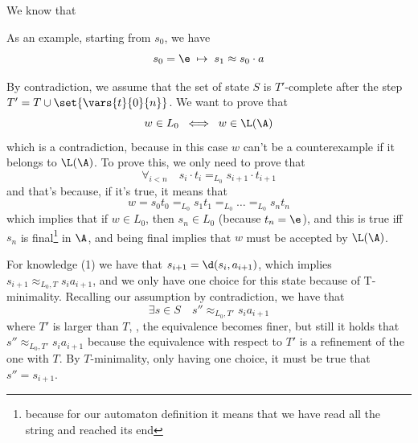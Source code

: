 \documentclass[oneside]{academica}
\begin{document}
\begin{proof*}
  We know that
  As an example, starting from $s_0$, we have
  \vspace{-10pt}
  \begin{equation*}
    s_0 = \e \;\mapsto\; s_1 \approx s_0 \cdot a
  \end{equation*}

  By contradiction, we assume that the set of state $S$ is $T'$-complete after the step $T' = T \cup \set{\vars{t}{0}{n}}$.
  We want to prove that
  \vspace{-10pt}
  \begin{equation*}
    w \in L_0 \;\iff\; w \in \L(\A)
  \end{equation*}
  which is a contradiction, because in this case $w$ can't be a counterexample if it belongs to $\L(\A)$.
  To prove this, we only need to prove that
  \vspace{-10pt}
  \begin{equation*}
    \forall_{i<n} \quad s_i \cdot t_i =_{L_0} s_{i+1} \cdot t_{i+1}
  \end{equation*}
  and that's because, if it's true, it means that
  \vspace{-10pt}
  \begin{equation*}
    w = s_0 t_0 =_{L_0} s_1 t_1 =_{L_0} \ldots =_{L_0} s_n t_n
  \end{equation*}
  which implies that if $w \in L_0$, then $s_n \in L_0$ (because $t_n = \e$), and this is true iff $s_n$ is final\footnote{because for our automaton definition it means that we have read all the string and reached its end} in $\A$, and being final implies that $w$ must be accepted by $\L(\A)$.

  \bigskip
  For knowledge (1) we have that $s_{i+1} = \d(s_i,a_{i+1})$, which implies $s_{i+1} \approx_{L_0,T} s_i a_{i+1}$, and we only have one choice for this state because of T-minimality.
  Recalling our assumption by contradiction, we have that
  \vspace{-10pt}
  \begin{equation*}
    \exists s \in S \quad s'' \approx_{L_0,T'} s_i a_{i+1}
  \end{equation*}
  where $T'$ is larger than $T$, \ie, the equivalence becomes finer, but still it holds that $s'' \approx_{L_0,T'} s_i a_{i+1}$ because the equivalence with respect to $T'$ is a refinement of the one with $T$.
  By $T$-minimality, only having one choice, it must be true that $s'' = s_{i+1}$.


\end{proof*}
\end{document}
